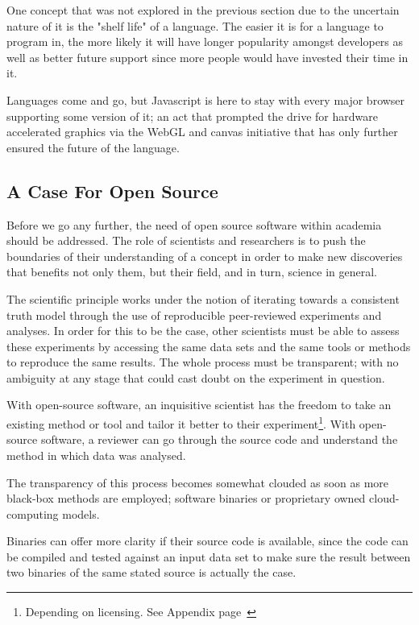 One concept that was not explored in the previous section due to the uncertain nature of it is the "shelf life" of a language. The easier it is for a language to program in, the more likely it will have longer popularity amongst  developers as well as better future support since more people would have invested their time in it. 

Languages come and go, but Javascript is here to stay with every major browser supporting some version of it; an act that prompted the drive for hardware accelerated graphics via the WebGL and canvas initiative that has only further ensured the future of the language.


\subsection{A Case For Open Source}


Before we go any further, the need of open source software within academia should be addressed. The role of scientists and researchers is to push the boundaries of their understanding of a concept in order to make new discoveries that benefits not only them, but their field, and in turn, science in general. 

The scientific principle works under the notion of iterating towards a consistent truth model through the use of reproducible peer-reviewed experiments and analyses.  In order for this to be the case, other scientists must be able to assess these experiments by accessing the same data sets and the same tools or methods to reproduce the same results. The whole process must be transparent; with no ambiguity at any stage that could cast doubt on the experiment in question.

With open-source software, an inquisitive scientist has the freedom to take an existing method or tool and tailor it better to their experiment\footnote{Depending on licensing. See Appendix page~\pageref{ref:app:licensing}}. With open-source software, a reviewer can go through the source code and understand the method in which data was analysed.

The transparency of this process becomes somewhat clouded as soon as more black-box methods are employed; software binaries or proprietary owned cloud-computing models.

Binaries can offer more clarity if their source code is available, since the code can be compiled and tested against an input data set to make sure the result between two binaries of the same stated source is actually the case.

